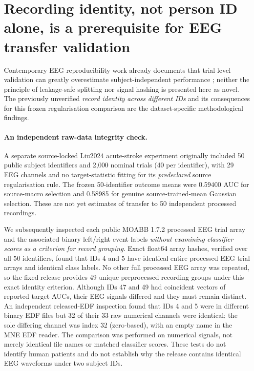\section{Recording identity, not person ID alone, is a prerequisite for EEG transfer validation}
\label{sec:v26-identity}
Contemporary EEG reproducibility work already documents that
trial-level validation can greatly overestimate subject-independent
performance \cite{gil2026subjectvalidation}; neither the
principle of leakage-safe splitting nor signal hashing is
presented here as novel. The previously unverified
\emph{record identity across different IDs} and its
consequences for this frozen regularisation comparison
are the dataset-specific methodological findings.

\paragraph{An independent raw-data integrity check.}
A separate source-locked Liu2024 acute-stroke experiment
originally included 50 public subject identifiers and
2,000 nominal trials (40 per identifier), with
29 EEG channels and no target-statistic fitting for
its \emph{predeclared} source regularisation rule.
The frozen 50-identifier outcome means were 0.59400
AUC for source-macro selection and 0.58985 for
genuine source-trained-mean Gaussian selection.
These are not yet estimates of transfer to 50
independent processed recordings.

We subsequently inspected each public MOABB 1.7.2
processed EEG trial array and the associated binary
left/right event labels \emph{without examining classifier
scores as a criterion for record grouping}. Exact
float64 array hashes, verified over all 50 identifiers,
found that IDs 4 and 5 have identical entire processed
EEG trial arrays and identical class labels.
No other full processed EEG array was repeated,
so the fixed release provides 49 unique preprocessed
recording groups under this exact identity criterion.
Although IDs 47 and 49 had coincident vectors of
reported target AUCs, their EEG signals differed
and they must remain distinct.
An independent released-EDF inspection found that
IDs 4 and 5 were in different binary EDF files but
32 of their 33 raw numerical channels were identical;
the sole differing channel was index 32 (zero-based),
with an empty name in the MNE EDF reader.
The comparison was performed on numerical signals,
not merely identical file names or matched classifier scores.
These tests do not identify human patients and do
not establish why the release contains identical
EEG waveforms under two subject IDs.

